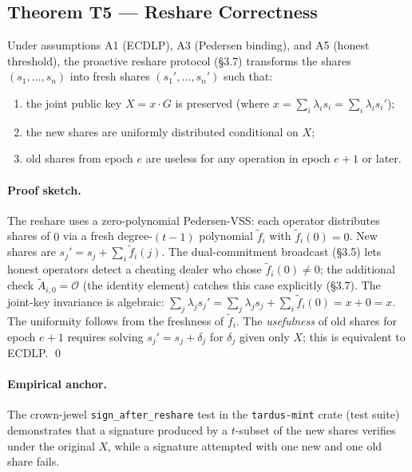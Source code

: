\subsection{Theorem T5 --- Reshare Correctness}
\label{sec:thm-reshare}

\begin{theorem}
\label{thm:reshare}
Under assumptions A1 (ECDLP), A3 (Pedersen binding), and A5 (honest
threshold), the proactive reshare protocol (\S3.7) transforms
the shares $(s_1, \ldots, s_n)$ into fresh shares $(s_1', \ldots, s_n')$
such that:
\begin{enumerate}[leftmargin=2em,itemsep=0pt]
  \item the joint public key $X = x \cdot G$ is preserved (where
        $x = \sum_{i} \lambda_i s_i = \sum_{i} \lambda_i s_i'$);
  \item the new shares are uniformly distributed conditional on $X$;
  \item old shares from epoch $e$ are useless for any operation in epoch
        $e + 1$ or later.
\end{enumerate}
\end{theorem}

\paragraph{Proof sketch.} The reshare uses a zero-polynomial Pedersen-VSS:
each operator distributes shares of $0$ via a fresh degree-$(t-1)$
polynomial $\tilde{f}_i$ with $\tilde{f}_i(0) = 0$. New shares are
$s_j' = s_j + \sum_i \tilde{f}_i(j)$. The dual-commitment broadcast
(\S3.5) lets honest operators detect a cheating
dealer who chose $\tilde{f}_i(0) \neq 0$; the additional check
$\tilde{A}_{i,0} = \mathcal{O}$ (the identity element)
catches this case explicitly (\S3.7). The
joint-key invariance is algebraic: $\sum_j \lambda_j s_j' =
\sum_j \lambda_j s_j + \sum_i \tilde{f}_i(0) = x + 0 = x$. The
uniformity follows from the freshness of $\tilde{f}_i$. The
\emph{usefulness} of old shares for epoch $e+1$ requires solving
$s_j' = s_j + \delta_j$ for $\delta_j$ given only $X$; this is equivalent
to ECDLP. \qed

\paragraph{Empirical anchor.} The crown-jewel
\texttt{sign\_after\_reshare} test in the \texttt{tardus-mint} crate
(test suite) demonstrates that a signature produced by a
$t$-subset of the new shares verifies under the original $X$, while a
signature attempted with one new and one old share fails.

